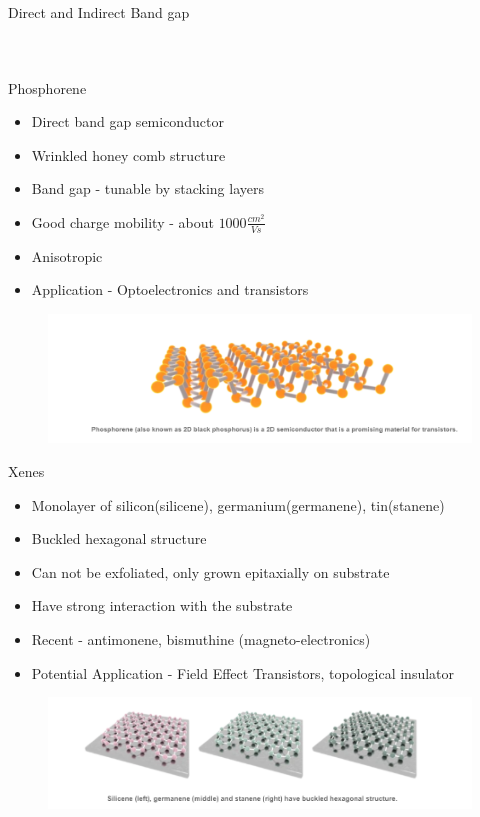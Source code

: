 \documentclass{beamer}
\begin{document}
\begin{frame}{Direct and Indirect Band gap}
\begin{columns}
\begin{figure}
    \end{figure}
    
\end{columns}
\end{frame}

\begin{frame}{Phosphorene}
    \begin{itemize}
        \item Direct band gap semiconductor
        \item Wrinkled honey comb structure
        \item Band gap - tunable by stacking layers
        \item Good charge mobility - about $1000 \frac{cm^2}{Vs}$
        \item Anisotropic
        \item Application - Optoelectronics and transistors
    \end{itemize}
    \begin{figure}
        \centering
        \includegraphics[scale=0.5]{phosphorene.PNG}
    \end{figure}
\end{frame}

\begin{frame}{Xenes}
    \begin{itemize}
        \item Monolayer of silicon(silicene), germanium(germanene), tin(stanene)
        \item Buckled hexagonal structure
        \item Can not be exfoliated, only grown epitaxially on substrate
        \item Have strong interaction with the substrate
        \item Recent - antimonene, bismuthine (magneto-electronics)
        \item Potential Application - Field Effect Transistors, topological insulator
    \end{itemize}
    \begin{figure}
        \centering
        \includegraphics[scale=0.5]{xenes.PNG}
    \end{figure}
\end{frame}
\end{document}
